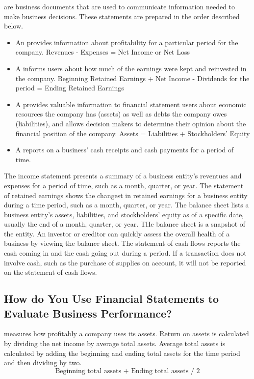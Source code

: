\documentclass{article}
\begin{document}
 are business documents that are used to communicate information needed to make business decisions. These statements are prepared in the order described below. 
\begin{itemize}
  \item An  provides information about profitability for a particular period for the company. Revenues - Expenses = Net Income or Net Loss 
  \item A  informs users about how much of the earnings were kept and reinvested in the company. Beginning Retained Earnings + Net Income - Dividends for the period = Ending Retained Earnings 
  \item A  provides valuable information to financial statement users about economic resources the company has (assets) as well as debts the company owes (liabilities), and allows decision makers to determine their opinion about the financial position of the company. Assets = Liabilities + Stockholders' Equity 
  \item A  reports on a business' cash receipts and cash payments for a period of time.
\end{itemize}

The income statement presents a summary of a business entity's reventues and expenses for a period of time, such as a month, quarter, or year. The statement of retained earnings shows the changest in retained earnings for a business entity during a time period, such as a month, quarter, or year. The balance sheet lists a business entity's assets, liabilities, and stockholders' equity as of a specific date, usually the end of a month, quarter, or year. THe balance sheet is a snapshot of the entity. An investor or creditor can quickly assess the overall health of a business by viewing the balance sheet. The statement of cash flows reports the cash coming in and the cash going out during a period. If a transaction does not involve cash, such as the purchase of supplies on account, it will not be reported on the statement of cash flows. 

\subsection{How do You Use Financial Statements to Evaluate Business Performance?}

 measures how profitably a company uses its assets. Return on assets is calculated by dividing the net income by average total assets. Average total assets is calculated by adding the beginning and ending total assets for the time period and then dividing by two. $$\textrm{Beginning total assets + Ending total assets / 2}$$
\end{document}
